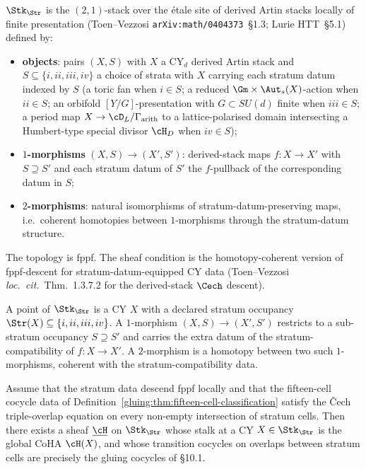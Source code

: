 \begin{definition}
\label{gluing:def:stratum-stack}
$\Stk_{\Str}$ is the $(2,1)$-stack over the \'etale site of derived
Artin stacks locally of finite presentation (Toen--Vezzosi
\texttt{arXiv:math/0404373}~\S 1.3; Lurie HTT~\S 5.1) defined by:
\begin{itemize}[leftmargin=1.5em]
 \item \textbf{objects}: pairs $(X,S)$ with $X$ a CY$_{d}$ derived
 Artin stack and $S\subseteq\{i,ii,iii,iv\}$ a choice of strata with
 $X$ carrying each stratum datum indexed by $S$ (a toric fan when
 $i\in S$; a reduced $\Gm\times\Aut_{s}(X)$-action when $ii\in S$; an
 orbifold $[Y/G]$-presentation with $G\subset SU(d)$ finite when
 $iii\in S$; a period map $X\to\cD_{L}/\Gamma_{\mathrm{arith}}$ to
 a lattice-polarised domain intersecting a Humbert-type special
 divisor $\cH_{D}$ when $iv\in S$);
 \item \textbf{$1$-morphisms} $(X,S)\to(X',S')$: derived-stack maps
 $f:X\to X'$ with $S\supseteq S'$ and each stratum datum of $S'$ the
 $f$-pullback of the corresponding datum in $S$;
 \item \textbf{$2$-morphisms}: natural isomorphisms of
 stratum-datum-preserving maps, i.e.\ coherent homotopies between
 $1$-morphisms through the stratum-datum structure.
\end{itemize}
The topology is fppf. The sheaf condition is the homotopy-coherent
version of fppf-descent for stratum-datum-equipped CY data
(Toen--Vezzosi \emph{loc.~cit.}~Thm.~1.3.7.2 for the derived-stack
$\Cech$ descent).
\end{definition}

\begin{remark}
A point of $\Stk_{\Str}$ is a CY $X$ with a declared stratum occupancy
$\Str(X)\subseteq\{i,ii,iii,iv\}$. A $1$-morphism
$(X,S)\to(X',S')$ restricts to a sub-stratum occupancy $S\supseteq S'$
and carries the extra datum of the stratum-compatibility of
$f:X\to X'$. A $2$-morphism is a homotopy between two such
$1$-morphisms, coherent with the stratum-compatibility data.
\end{remark}

\begin{theorem}
\label{gluing:thm:sheaf-of-cohas}
Assume that the stratum data descend fppf locally and that the
fifteen-cell cocycle data of
Definition~\ref{gluing:thm:fifteen-cell-classification} satisfy the
\v{C}ech triple-overlap equation on every non-empty intersection of
stratum cells. Then there exists a sheaf $\underline{\cH}$ on
$\Stk_{\Str}$ whose stalk at a CY $X\in\Stk_{\Str}$ is the global CoHA
$\cH(X)$, and whose transition cocycles on overlaps between stratum
cells are precisely the gluing cocycles of \S 10.1.
\end{theorem}

